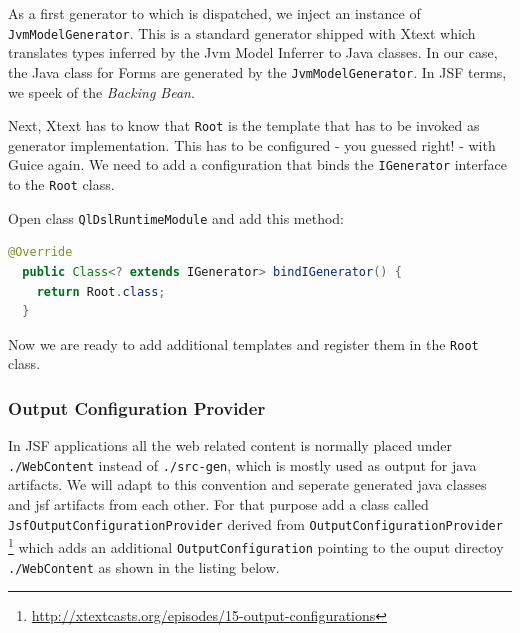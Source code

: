 As a first generator to which is dispatched, we inject an instance of
\texttt{JvmModelGenerator}. This is a standard generator shipped with Xtext which
translates types inferred by the Jvm Model Inferrer to Java classes.
In our case, the Java class for Forms are generated by the
\texttt{JvmModelGenerator}. In JSF terms, we speek of the \emph{Backing Bean}.
 
Next, Xtext has to know that \texttt{Root} is the template that has to be invoked
as generator implementation. This has to be configured - you guessed right! - 
with Guice again. We need to add a configuration that binds the \texttt{IGenerator}
interface to the \texttt{Root} class.

Open class \texttt{QlDslRuntimeModule} and add this method:

\begin{lstlisting}[language=Java]
  @Override
  public Class<? extends IGenerator> bindIGenerator() {
    return Root.class;
  }
\end{lstlisting}

Now we are ready to add additional templates and register them in the
\texttt{Root} class.

\subsubsection{Output Configuration Provider}
\label{sec:outputConfigurationProvider}

In JSF applications all the web related content is normally placed under
\texttt{./WebContent} instead of \texttt{./src-gen}, which is mostly used as
output for java artifacts. We will adapt to this convention and seperate
generated java classes and jsf artifacts from each other. For that purpose add a class called
\texttt{JsfOutputConfigurationProvider} derived from
\texttt{OutputConfigurationProvider}
\footnote{\url{http://xtextcasts.org/episodes/15-output-configurations}} which
adds an additional \texttt{OutputConfiguration} pointing to the ouput directoy
\texttt{./WebContent} as shown in the listing below.

